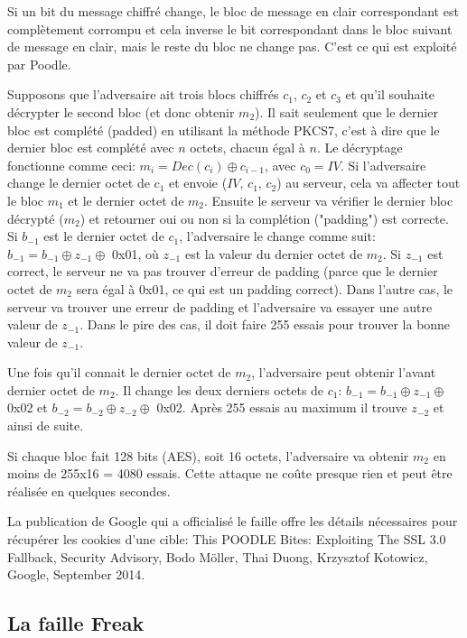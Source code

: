 Si un bit du message chiffré change, le bloc de message en clair correspondant est complètement corrompu et cela inverse le bit correspondant dans le bloc suivant de message en clair, mais le reste du bloc ne change pas. C'est ce qui est exploité par Poodle.

Supposons que l'adversaire ait trois blocs chiffrés $c_1$, $c_2$ et $c_3$ et qu'il souhaite décrypter le second bloc (et donc obtenir $m_2$). Il sait seulement que le dernier bloc est complété (padded) en utilisant la méthode PKCS7, c'est à dire que le dernier bloc est complété avec $n$ octets, chacun égal à $n$.
Le décryptage fonctionne comme ceci: $m_i = Dec(c_i) \oplus c_{i-1}$, avec $c_0 = IV$. Si l'adversaire change le dernier octet de $c_1$ et envoie ($IV$, $c_1$, $c_2$) au serveur, cela va affecter tout le bloc $m_1$ et le dernier octet de $m_2$. Ensuite le serveur va vérifier le dernier bloc décrypté ($m_2$) et retourner oui ou non si la complétion ("padding") est correcte.
Si $b_{-1}$ est le dernier octet de $c_1$, l'adversaire le change comme suit: $b_{-1} = b_{-1} \oplus z_{-1} \oplus$ 0x01, où $z_{-1}$ est la valeur du dernier octet de $m_2$. Si $z_{-1}$ est correct, le serveur ne va pas trouver d'erreur de padding (parce que le dernier octet de $m_2$ sera égal à 0x01, ce qui est un padding correct). Dans l'autre cas, le serveur va trouver une erreur de padding et l'adversaire va essayer une autre valeur de $z_{-1}$. Dans le pire des cas, il doit faire 255 essais pour trouver la bonne valeur de $z_{-1}$.

Une fois qu'il connait le dernier octet de $m_2$, l'adversaire peut obtenir l'avant dernier octet de $m_2$. Il change les deux derniers octets de $c_1$: $b_{-1} = b_{-1} \oplus z_{-1} \oplus$ 0x02 et $b_{-2} = b_{-2} \oplus z_{-2} \oplus$ 0x02. Après 255 essais au maximum il trouve $z_{-2}$ et ainsi de suite. 

Si chaque bloc fait 128 bits (AES), soit 16 octets, l'adversaire va obtenir $m_2$ en moins de 255x16 = 4080 essais. Cette attaque ne co\^ute presque rien et peut \^etre réalisée en quelques secondes.

La publication de Google qui a officialisé le faille offre les détails nécessaires pour récupérer les cookies d'une cible: This POODLE Bites: Exploiting The SSL 3.0 Fallback, Security Advisory, Bodo Möller, Thai Duong, Krzysztof Kotowicz, Google, September 2014.


\subsection{La faille Freak}


